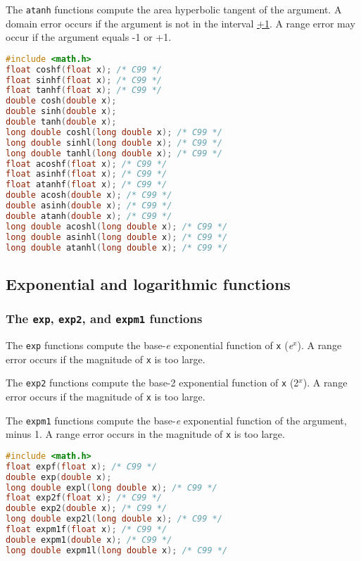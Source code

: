 The \texttt{atanh} functions compute the area hyperbolic tangent of the
argument. A domain error occurs if the argument is not in the interval
\href{-1,}{+1}. A range error may occur if the argument equals -1 or +1.

\lstset{basicstyle=\scriptsize, numbers=left, captionpos=b, tabsize=4}
\begin{lstlisting}[caption=Section \thesection listing \arabic{furthermathcnt},language={C},
breaklines=true,xleftmargin=15pt,label=lst:section\thesection listing\arabic{furthermathcnt}]
#include <math.h>
float coshf(float x); /* C99 */
float sinhf(float x); /* C99 */
float tanhf(float x); /* C99 */
double cosh(double x); 
double sinh(double x);
double tanh(double x);
long double coshl(long double x); /* C99 */
long double sinhl(long double x); /* C99 */
long double tanhl(long double x); /* C99 */
float acoshf(float x); /* C99 */
float asinhf(float x); /* C99 */
float atanhf(float x); /* C99 */
double acosh(double x); /* C99 */
double asinh(double x); /* C99 */
double atanh(double x); /* C99 */
long double acoshl(long double x); /* C99 */
long double asinhl(long double x); /* C99 */
long double atanhl(long double x); /* C99 */
\end{lstlisting}

\subsection{Exponential and logarithmic functions}
\subsubsection{The \texttt{exp}, \texttt{exp2}, and \texttt{expm1} functions}
The \texttt{exp} functions compute the base-\emph{e} exponential function of
\texttt{x} (\emph{e}\(^{x}\)). A range error occurs if the magnitude of
\texttt{x} is too large.

The \texttt{exp2} functions compute the base-2 exponential function of
\texttt{x} (2\(^{x}\)). A range error occurs if the magnitude of \texttt{x} is
too large.

The \texttt{expm1} functions compute the base-\emph{e} exponential function of
the argument, minus 1. A range error occurs in the magnitude of \texttt{x} is
too large.

\lstset{basicstyle=\scriptsize, numbers=left, captionpos=b, tabsize=4}
\begin{lstlisting}[caption=Section \thesection listing \arabic{furthermathcnt},language={C},
breaklines=true,xleftmargin=15pt,label=lst:section\thesection listing\arabic{furthermathcnt}]
#include <math.h>
float expf(float x); /* C99 */
double exp(double x);
long double expl(long double x); /* C99 */
float exp2f(float x); /* C99 */
double exp2(double x); /* C99 */
long double exp2l(long double x); /* C99 */
float expm1f(float x); /* C99 */
double expm1(double x); /* C99 */
long double expm1l(long double x); /* C99 */
\end{lstlisting}

